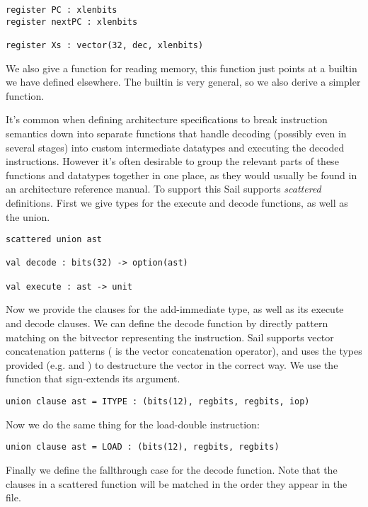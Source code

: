 \begin{lstlisting}
register PC : xlenbits
register nextPC : xlenbits

register Xs : vector(32, dec, xlenbits)
\end{lstlisting}



\sailoverloadAX

We also give a function  for reading memory, this function
just points at a builtin we have defined elsewhere.  The builtin is
very general, so we also derive a simpler  function.


\sailvalreadMem
\sailfnreadMem

It's common when defining architecture specifications to break
instruction semantics down into separate functions that handle
decoding (possibly even in several stages) into custom intermediate
datatypes and executing the decoded instructions. However it's often
desirable to group the relevant parts of these functions and datatypes
together in one place, as they would usually be found in an
architecture reference manual. To support this Sail supports
\emph{scattered} definitions. First we give types for the execute and
decode functions, as well as the  union.


\begin{lstlisting}
scattered union ast

val decode : bits(32) -> option(ast)

val execute : ast -> unit
\end{lstlisting}

Now we provide the clauses for the add-immediate  type, as
well as its execute and decode clauses. We can define the decode
function by directly pattern matching on the bitvector representing
the instruction. Sail supports vector concatenation patterns (
is the vector concatenation operator), and uses the types provided
(e.g.  and ) to destructure the vector in the
correct way. We use the  function that sign-extends
its argument.

\begin{lstlisting}
union clause ast = ITYPE : (bits(12), regbits, regbits, iop)
\end{lstlisting}

\sailfclITYPEdecode
\sailfclITYPEexecute

\noindent Now we do the same thing for the load-double instruction:

\begin{lstlisting}
union clause ast = LOAD : (bits(12), regbits, regbits)
\end{lstlisting}

\sailfclLOADdecode
\sailfclLOADexecute

\noindent Finally we define the fallthrough case for the decode function. Note
that the clauses in a scattered function will be matched in the order
they appear in the file.
